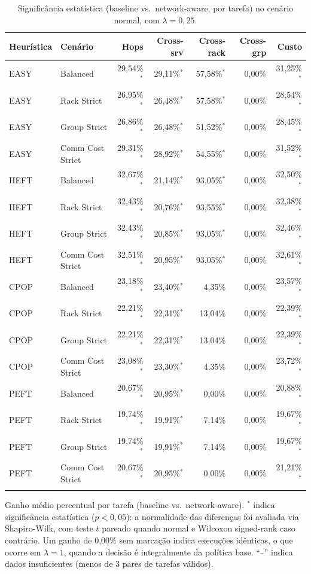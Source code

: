 \begin{table}[htbp]
\centering
\small
\caption{Significância estatística (baseline vs.\ network-aware, por tarefa) no cenário normal, com $\lambda = 0{,}25$.}
\label{tab:significancia_normal_lambda_025}
\begin{tabular}{llrrrrr}
\toprule
Heurística & Cenário & Hops & Cross-srv & Cross-rack & Cross-grp & Custo \\
\midrule
EASY & Balanced & 29,54\%$^{*}$ & 29,11\%$^{*}$ & 57,58\%$^{*}$ & 0,00\% & 31,25\%$^{*}$ \\
EASY & Rack Strict & 26,95\%$^{*}$ & 26,48\%$^{*}$ & 57,58\%$^{*}$ & 0,00\% & 28,54\%$^{*}$ \\
EASY & Group Strict & 26,86\%$^{*}$ & 26,48\%$^{*}$ & 51,52\%$^{*}$ & 0,00\% & 28,45\%$^{*}$ \\
EASY & Comm Cost Strict & 29,31\%$^{*}$ & 28,92\%$^{*}$ & 54,55\%$^{*}$ & 0,00\% & 31,52\%$^{*}$ \\
\addlinespace
HEFT & Balanced & 32,67\%$^{*}$ & 21,14\%$^{*}$ & 93,05\%$^{*}$ & 0,00\% & 32,50\%$^{*}$ \\
HEFT & Rack Strict & 32,43\%$^{*}$ & 20,76\%$^{*}$ & 93,55\%$^{*}$ & 0,00\% & 32,38\%$^{*}$ \\
HEFT & Group Strict & 32,43\%$^{*}$ & 20,85\%$^{*}$ & 93,05\%$^{*}$ & 0,00\% & 32,46\%$^{*}$ \\
HEFT & Comm Cost Strict & 32,51\%$^{*}$ & 20,95\%$^{*}$ & 93,05\%$^{*}$ & 0,00\% & 32,61\%$^{*}$ \\
\addlinespace
CPOP & Balanced & 23,18\%$^{*}$ & 23,40\%$^{*}$ & 4,35\% & 0,00\% & 23,57\%$^{*}$ \\
CPOP & Rack Strict & 22,21\%$^{*}$ & 22,31\%$^{*}$ & 13,04\% & 0,00\% & 22,39\%$^{*}$ \\
CPOP & Group Strict & 22,21\%$^{*}$ & 22,31\%$^{*}$ & 13,04\% & 0,00\% & 22,39\%$^{*}$ \\
CPOP & Comm Cost Strict & 23,08\%$^{*}$ & 23,30\%$^{*}$ & 4,35\% & 0,00\% & 23,72\%$^{*}$ \\
\addlinespace
PEFT & Balanced & 20,67\%$^{*}$ & 20,95\%$^{*}$ & 0,00\% & 0,00\% & 20,88\%$^{*}$ \\
PEFT & Rack Strict & 19,74\%$^{*}$ & 19,91\%$^{*}$ & 7,14\% & 0,00\% & 19,67\%$^{*}$ \\
PEFT & Group Strict & 19,74\%$^{*}$ & 19,91\%$^{*}$ & 7,14\% & 0,00\% & 19,67\%$^{*}$ \\
PEFT & Comm Cost Strict & 20,67\%$^{*}$ & 20,95\%$^{*}$ & 0,00\% & 0,00\% & 21,21\%$^{*}$ \\
\addlinespace
\bottomrule
\end{tabular}

\vspace{2mm}
\footnotesize Ganho médio percentual por tarefa (baseline vs.\ network-aware). $^{*}$ indica significância estatística ($p<0{,}05$): a normalidade das diferenças foi avaliada via Shapiro-Wilk, com teste $t$ pareado quando normal e Wilcoxon signed-rank caso contrário. Um ganho de 0,00\% sem marcação indica execuções idênticas, o que ocorre em $\lambda = 1$, quando a decisão é integralmente da política base. ``--'' indica dados insuficientes (menos de 3 pares de tarefas válidos).
\end{table}
